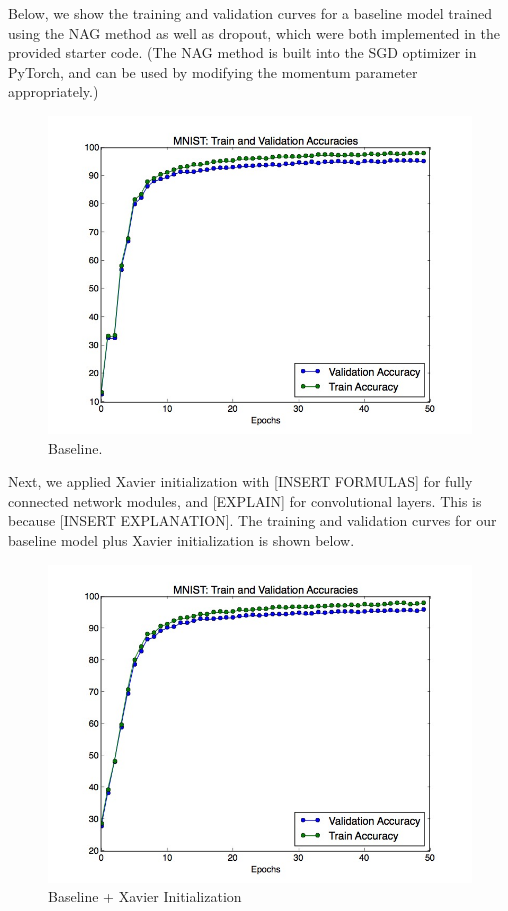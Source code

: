 \documentclass[a4paper]{article}
\begin{document}
\begin{enumerate}
{Below, we show the training and validation curves for a baseline model trained using the NAG method as well as dropout, which were both implemented in the provided starter code. (The NAG method is built into the SGD optimizer in PyTorch, and can be used by modifying the momentum parameter appropriately.)

\begin{figure}
  \includegraphics[width=12cm]{../plots/accuracies_baseline.jpg}
  \centering
  \caption{Baseline.}
  \label{fig:boat1}
\end{figure}

Next, we applied Xavier initialization with [INSERT FORMULAS] for fully connected network modules, and [EXPLAIN] for convolutional layers. This is because [INSERT EXPLANATION]. The training and validation curves for our baseline model plus Xavier initialization is shown below.

\begin{figure}
  \includegraphics[width=12cm]{../plots/accuracies_xavier.jpg}
  \centering
  \caption{Baseline + Xavier Initialization}
  \label{fig:boat1}
\end{figure}

}
\end{enumerate}
\end{document}
